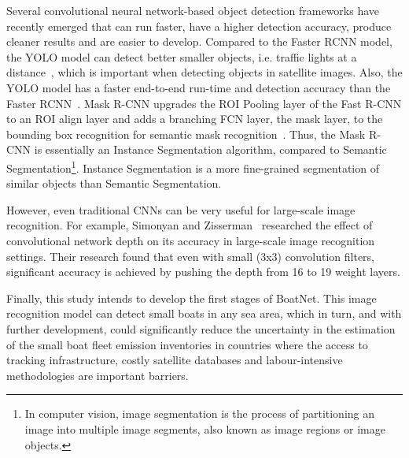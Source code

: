 Several convolutional neural network-based object detection frameworks have recently emerged that can run faster, have a higher detection accuracy, produce cleaner results and are easier to develop. Compared to the Faster RCNN model, the YOLO model can detect better smaller objects, i.e. traffic lights at a distance~\cite{Dwivedi2020YOLOv5}, which is important when detecting objects in satellite images. Also, the YOLO model has a faster end-to-end run-time and detection accuracy than the Faster RCNN~\cite{Dwivedi2020YOLOv5}. Mask R-CNN upgrades the ROI Pooling layer of the Fast R-CNN to an ROI align layer and adds a branching FCN layer, the mask layer, to the bounding box recognition for semantic mask recognition~\cite{he2017mask}. Thus, the Mask R-CNN is essentially an Instance Segmentation algorithm, compared to Semantic Segmentation\footnote{In computer vision, image segmentation is the process of partitioning an image into multiple image segments, also known as image regions or image objects.}. Instance Segmentation is a more fine-grained segmentation of similar objects than Semantic Segmentation.

However, even traditional CNNs can be very useful for large-scale image recognition. For example, Simonyan and Zisserman~\cite{Simonyan2015VeryDC} researched the effect of convolutional network depth on its accuracy in large-scale image recognition settings. Their research found that even with small (3x3) convolution filters, significant accuracy is achieved by pushing the depth from 16 to 19 weight layers.

Finally, this study intends to develop the first stages of BoatNet. This image recognition model can detect small boats in any sea area, which in turn, and with further development, could significantly reduce the uncertainty in the estimation of the small boat fleet emission inventories in countries where the access to tracking infrastructure, costly satellite databases and labour-intensive methodologies are important barriers.
